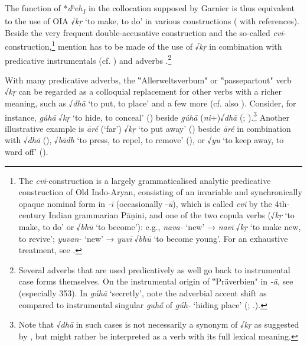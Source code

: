 \documentclass[output=paper,colorlinks,citecolor=brown]{langscibook}
\begin{document}
The function of *\textit{dʰeh\textsubscript{1}} in the collocation supposed by Garnier is thus equivalent to the use of OIA √\textit{kṛ} ‘to make, to do’ in various constructions (\citealt[41--44]{Ittzés2016} with references). Beside the very frequent double-accusative construction and the so-called \textit{cvi}-construction,\footnote{The \textit{cvi}-construction is a largely grammaticalised analytic predicative construction of Old Indo-Aryan, consisting of an invariable and synchronically opaque nominal form in \textit{-ī} (occasionally -\textit{ū}), which is called \textit{cvi} by the 4th-century Indian grammarian Pāṇini, and one of the two copula verbs (√\textit{kṛ} ‘to make, to do’ or √\textit{bhū} ‘to become’): e.g., \textit{nava-} ‘new’ → \textit{navī} √\textit{kṛ} ‘to make new, to revive’; \textit{yuvan-} ‘new’ → \textit{yuvī} √\textit{bhū} ‘to become young’. For an exhaustive treatment, see \citet{Balles2006}.}
mention has to be made of the use of √\textit{kṛ} in combination with predicative instrumentals (cf. \citealt[245--247]{Balles2006}) and adverbs \citep{Hoffmann1976a}.\footnote{Several adverbs that are used predicatively as well go back to instrumental case forms themselves. On the instrumental origin of ‟Präverbien" in \textit{-ā}, see \citealt{Hoffmann1976b} (especially 353). In \textit{gúhā} ‘secretly’, note the adverbial accent shift as compared to instrumental singular \textit{guhā́}  of \textit{gúh-} ‘hiding place’ (\citealt[144]{Jasanoff2002-2003}; \citealt[116 n. 2]{Hoffmann1975}.).} 

With many predicative adverbs, the ‟Allerweltsverbum" or ‟passepartout" verb √\textit{kṛ} can be regarded as a colloquial replacement for other verbs with a richer meaning, such as √\textit{dhā} ‘to put, to place’ and a few more (cf. also \citealt[350 with n. 4]{Hoffmann1976b}). Consider, for instance, \textit{gúhā} √\textit{kṛ} ‘to hide, to conceal’ () beside \textit{gúhā} (\textit{ni}+)√\textit{dhā} (; ).\footnote{Note that √\textit{dhā} in such cases is not necessarily a synonym of √\textit{kṛ} as suggested by \citet[144--145]{Jasanoff2002-2003}, but might rather be interpreted as a verb with its full lexical meaning.}     Another illustrative example is \textit{āré} (‘far’) √\textit{kṛ} ‘to put away’ () beside \textit{āré} in combination with √\textit{dhā} (), √\textit{bādh} ‘to press, to repel, to remove’ (), or √\textit{yu} ‘to keep away, to ward off’ ().
\end{document}
